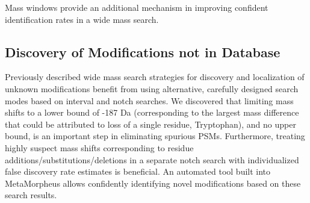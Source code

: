 \documentclass[journal=jprobs,manuscript=article]{achemso}
\begin{document}
Mass windows provide an additional mechanism in improving confident identification rates in a wide mass search. 

\subsection{Discovery of Modifications not in Database}

Previously described wide mass search strategies for discovery and localization of unknown modifications benefit from using alternative, carefully designed search modes based on interval and notch searches. We discovered that limiting mass shifts to a lower bound of -187 Da (corresponding to the largest mass difference that could be attributed to loss of a single residue, Tryptophan), and no upper bound, is an important step in eliminating spurious PSMs. Furthermore, treating highly suspect mass shifts corresponding to residue additions/substitutions/deletions in a separate notch search with individualized false discovery rate estimates is beneficial. An automated tool built into MetaMorpheus allows confidently identifying novel modifications based on these search results.
\end{document}
